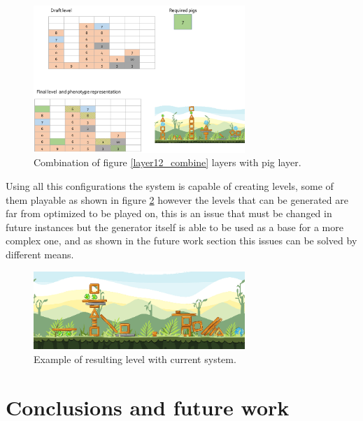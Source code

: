 \documentclass[conference]{IEEEtran}
\begin{document}
    \begin{figure}[htbp]
        \centerline{\includegraphics[width=80mm]{Images/layer123_combine.png}}
        \caption{Combination of figure \ref{layer12_combine} layers with pig layer.}
        \label{layer123_combine}
    \end{figure}
    
    Using all this configurations the system is capable of creating levels, some of
    them playable as shown in figure \ref{result_1} however the levels that can be
    generated are far from optimized to be played on, this is an issue that must be
    changed in future instances but the generator itself is able to be used as a
    base for a more complex one, and as shown in the future work section this issues
    can be solved by different means.
    
    \begin{figure}[htbp]
        \centerline{\includegraphics[width=80mm]{Images/Result_n2.png}}
        \caption{Example of resulting level with current system.}
        \label{result_1}
    \end{figure}
    
    \section{Conclusions and future work}
    
\end{document}

